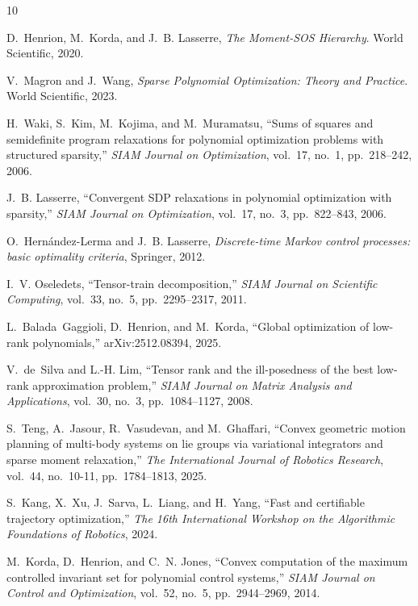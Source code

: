\documentclass[11pt,a4paper]{article}
\theoremstyle{definition}
\begin{document}
\begin{thebibliography}{10}

D.~Henrion, M.~Korda, and J.~B. Lasserre, {\em The Moment-SOS Hierarchy}.
\newblock World Scientific, 2020.

V.~Magron and J.~Wang, {\em Sparse Polynomial Optimization: Theory and
  Practice}.
\newblock World Scientific, 2023.

H.~Waki, S.~Kim, M.~Kojima, and M.~Muramatsu, ``Sums of squares and
  semidefinite program relaxations for polynomial optimization problems with
  structured sparsity,'' {\em SIAM Journal on Optimization}, vol.~17, no.~1,
  pp.~218--242, 2006.

J.~B. Lasserre, ``Convergent {{SDP}} relaxations in polynomial optimization
  with sparsity,'' {\em SIAM Journal on Optimization}, vol.~17, no.~3,
  pp.~822--843, 2006.

O.~Hern{\'a}ndez-Lerma and J.~B. Lasserre, {\em Discrete-time Markov control
  processes: basic optimality criteria}, 
\newblock Springer, 2012.

I.~V. Oseledets, ``Tensor-train decomposition,'' {\em SIAM Journal on
  Scientific Computing}, vol.~33, no.~5, pp.~2295--2317, 2011.

L.~Balada~Gaggioli, D.~Henrion, and M.~Korda, ``Global optimization of low-rank
  polynomials,'' arXiv:2512.08394, 2025.

V.~de~Silva and L.-H. Lim, ``Tensor rank and the ill-posedness of the best
  low-rank approximation problem,'' {\em SIAM Journal on Matrix Analysis and
  Applications}, vol.~30, no.~3, pp.~1084--1127, 2008.

S.~Teng, A.~Jasour, R.~Vasudevan, and M.~Ghaffari, ``Convex geometric motion
  planning of multi-body systems on lie groups via variational integrators and
  sparse moment relaxation,'' {\em The International Journal of Robotics
  Research}, vol.~44, no.~10-11, pp.~1784--1813, 2025.

S.~Kang, X.~Xu, J.~Sarva, L.~Liang, and H.~Yang, ``Fast and certifiable
  trajectory optimization,'' {\em The 16th International Workshop on the
  Algorithmic Foundations of Robotics}, 2024.

M.~Korda, D.~Henrion, and C.~N. Jones, ``Convex computation of the maximum
  controlled invariant set for polynomial control systems,'' {\em SIAM Journal
  on Control and Optimization}, vol.~52, no.~5, pp.~2944--2969, 2014.


\end{thebibliography}
\end{document}
